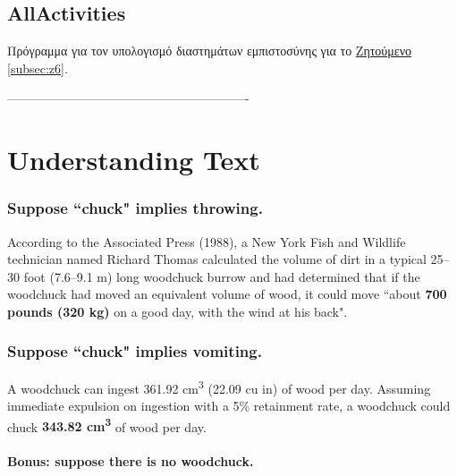 \documentclass[11pt]{scrartcl} %
\begin{document}
\subsection{AllActivities}
\label{prog:AllActivities}
Πρόγραμμα για τον υπολογισμό διαστημάτων εμπιστοσύνης για το \hyperref[subsection:z6]{Ζητούμενο \ref*{subsec:z6}}.

	
	
	
	
	
	
----------------------------------------------------------

\section{Understanding Text}


\subsubsection{Suppose ``chuck" implies throwing.}

According to the Associated Press (1988), a New York Fish and Wildlife technician named Richard Thomas calculated the volume of dirt in a typical 25--30 foot (7.6--9.1 m) long woodchuck burrow and had determined that if the woodchuck had moved an equivalent volume of wood, it could move ``about \textbf{700 pounds (320 kg)} on a good day, with the wind at his back".


\subsubsection{Suppose ``chuck" implies vomiting.}

A woodchuck can ingest 361.92 cm\textsuperscript{3} (22.09 cu in) of wood per day. Assuming immediate expulsion on ingestion with a 5\% retainment rate, a woodchuck could chuck \textbf{343.82 cm\textsuperscript{3}} of wood per day.


\paragraph{Bonus: suppose there is no woodchuck.}
\end{document}
